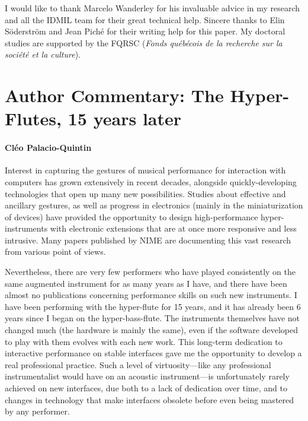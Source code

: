 \begin{acknowledgement}
I would like to thank Marcelo Wanderley for his invaluable advice in my research and all the IDMIL team for their great technical help. Sincere thanks to Elin S\"{o}derstr\"{o}m and Jean Pich\'{e} for their writing help for this paper. My doctoral studies are supported by the FQRSC (\emph {Fonds qu\'{e}b\'{e}cois de la recherche sur la soci\'{e}t\'{e} et la culture}).
\end{acknowledgement}


\section*{Author Commentary: The Hyper-Flutes, 15 years later}

\paragraph{Cl\'{e}o Palacio-Quintin}

Interest in capturing the gestures of musical performance for interaction with computers has grown extensively in recent decades, alongside quickly-developing technologies that open up many new possibilities. Studies about effective and ancillary gestures, as well as progress in electronics (mainly in the miniaturization of devices) have provided the opportunity to design high-performance hyper-instruments with electronic extensions that are at once more responsive and less intrusive. Many papers published by NIME are documenting this vast research from various point of views.

Nevertheless, there are very few performers who have played consistently on the same augmented instrument for as many years as I have, and there have been almost no publications concerning performance skills on such new instruments. I have been performing with the hyper-flute for 15 years, and it has already been 6 years since I began on the hyper-bass-flute. The instruments themselves have not changed much (the hardware is mainly the same), even if the software developed to play with them evolves with each new work. This long-term dedication to interactive performance on stable interfaces gave me the opportunity to develop a real professional practice. Such a level of virtuosity---like any professional instrumentalist would have on an acoustic instrument---is unfortunately rarely achieved on new interfaces, due both to a lack of dedication over time, and to changes in technology that make interfaces obsolete before even being mastered by any performer. 


